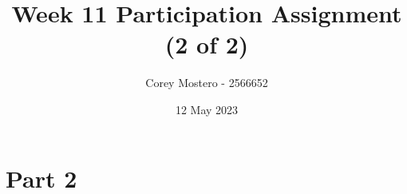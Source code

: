 \documentclass{article}
\title{Week 11 Participation Assignment (2 of 2)}
\author{Corey Mostero - 2566652}
\date{12 May 2023}
\begin{document}
\newcommand{\hr}{\par\noindent\rule{\textwidth}{0.4pt}}

\newcommand{\bc}[1]{
	\begin{equation*}
		\begin{boxed}
			{#1}
		\end{boxed}
	\end{equation*}
}

\newcommand{\cond}[2]{
	\ifmmode
		{#1} \quad {#2}
	\else
		$$ {#1} \quad {#2} $$
	\fi
}

\newcommand{\matr}[1]{
	\ifmmode \bm{#1}
	\else \textit{\textbf{#1}}
	\fi
}
\newcommand{\vect}[1]{
	\ifmmode \mathbf{#1}
	\else \textbf{#1}
	\fi
}

\maketitle
\newpage

\tableofcontents

\section{Part 2}
\end{document}
